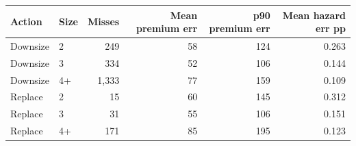 \begin{tabular}{llrrrr}
\toprule
Action & Size & Misses & Mean premium err & p90 premium err & Mean hazard err pp \\
\midrule
Downsize & 2 &   249 & 58 & 124 & 0.263 \\
Downsize & 3 &   334 & 52 & 106 & 0.144 \\
Downsize & 4+ & 1,333 & 77 & 159 & 0.109 \\
Replace & 2 &    15 & 60 & 145 & 0.312 \\
Replace & 3 &    31 & 55 & 106 & 0.151 \\
Replace & 4+ &   171 & 85 & 195 & 0.123 \\
\bottomrule
\end{tabular}
